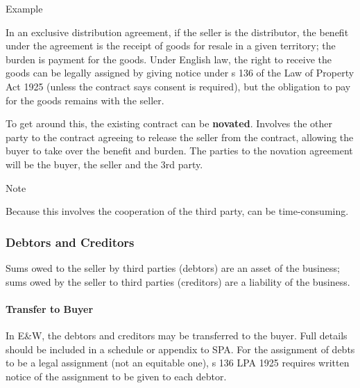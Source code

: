 \documentclass[
]{article}
\newenvironment{env-e851f727-a00b-4cd9-88bb-15d38a5b7711}
{
    \savenotes\tcolorbox[blanker,breakable,left=5pt,borderline west={2pt}{-4pt}{blue}]
}
{
    \endtcolorbox\spewnotes
}
\newenvironment{env-bbf8706e-ba13-4592-a749-535bfb449c22}
{
    \savenotes\tcolorbox[blanker,breakable,left=5pt,borderline west={2pt}{-4pt}{purple}]
}
{
    \endtcolorbox\spewnotes
}
\begin{document}
\begin{env-bbf8706e-ba13-4592-a749-535bfb449c22}

Example

In an exclusive distribution agreement, if the seller is the
distributor, the benefit under the agreement is the receipt of goods for
resale in a given territory; the burden is payment for the goods. Under
English law, the right to receive the goods can be legally assigned by
giving notice under s 136 of the Law of Property Act 1925 (unless the
contract says consent is required), but the obligation to pay for the
goods remains with the seller.

\end{env-bbf8706e-ba13-4592-a749-535bfb449c22}

To get around this, the existing contract can be \textbf{novated}.
Involves the other party to the contract agreeing to release the seller
from the contract, allowing the buyer to take over the benefit and
burden. The parties to the novation agreement will be the buyer, the
seller and the 3rd party.

\begin{env-e851f727-a00b-4cd9-88bb-15d38a5b7711}

Note

Because this involves the cooperation of the third party, can be
time-consuming.

\end{env-e851f727-a00b-4cd9-88bb-15d38a5b7711}

\hypertarget{debtors-and-creditors}{%
\subsubsection{Debtors and Creditors}\label{debtors-and-creditors}}

Sums owed to the seller by third parties (debtors) are an asset of the
business; sums owed by the seller to third parties (creditors) are a
liability of the business.

\hypertarget{transfer-to-buyer}{%
\paragraph{Transfer to Buyer}\label{transfer-to-buyer}}

In E\&W, the debtors and creditors may be transferred to the buyer. Full
details should be included in a schedule or appendix to SPA. For the
assignment of debts to be a legal assignment (not an equitable one), s
136 LPA 1925 requires written notice of the assignment to be given to
each debtor.
\end{document}
